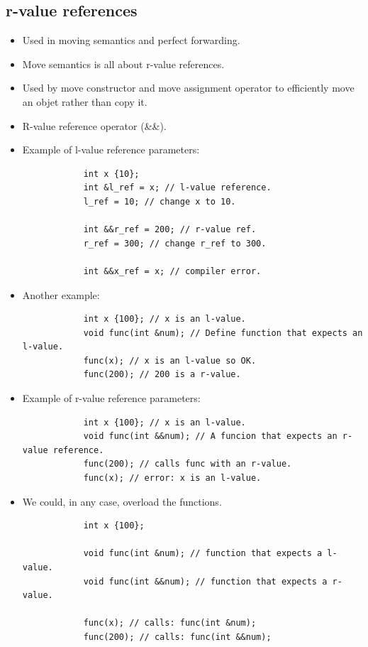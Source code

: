 \subsection{r-value references}
\begin{itemize}
    \item Used in moving semantics and perfect forwarding.
    \item Move semantics is all about r-value references.
    \item Used by move constructor and move assignment operator to efficiently move an objet rather than copy it. 
    \item R-value reference operator (\&\&).
    \item Example of l-value reference parameters:
        \begin{verbatim}
            int x {10};
            int &l_ref = x; // l-value reference.
            l_ref = 10; // change x to 10.

            int &&r_ref = 200; // r-value ref.
            r_ref = 300; // change r_ref to 300.

            int &&x_ref = x; // compiler error.
        \end{verbatim}
    
    \item Another example:
        \begin{verbatim}
            int x {100}; // x is an l-value.
            void func(int &num); // Define function that expects an l-value.
            func(x); // x is an l-value so OK.
            func(200); // 200 is a r-value.
        \end{verbatim}
    
    \item Example of r-value reference parameters:
        \begin{verbatim}
            int x {100}; // x is an l-value.
            void func(int &&num); // A funcion that expects an r-value reference.
            func(200); // calls func with an r-value.
            func(x); // error: x is an l-value.
        \end{verbatim}
    
    \item We could, in any case, overload the functions.
        \begin{verbatim}
            int x {100};
    
            void func(int &num); // function that expects a l-value.
            void func(int &&num); // function that expects a r-value.

            func(x); // calls: func(int &num);
            func(200); // calls: func(int &&num);
        \end{verbatim}
\end{itemize}

